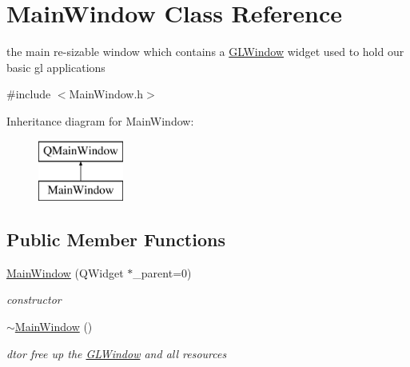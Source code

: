 \hypertarget{class_main_window}{\section{Main\-Window Class Reference}
\label{class_main_window}
}


the main re-\/sizable window which contains a \hyperlink{class_g_l_window}{G\-L\-Window} widget used to hold our basic gl applications  




{\ttfamily \#include $<$Main\-Window.\-h$>$}

Inheritance diagram for Main\-Window\-:\begin{figure}[H]
\begin{center}
\leavevmode
\includegraphics[height=2.000000cm]{class_main_window}
\end{center}
\end{figure}
\subsection*{Public Member Functions}
\begin{DoxyCompactItemize}
\item 
\hyperlink{class_main_window_a93cfdcac35db98baf6a7d2c2738a2006}{Main\-Window} (Q\-Widget $\ast$\-\_\-parent=0)
\begin{DoxyCompactList}\small\item\em constructor \end{DoxyCompactList}\item 
\hypertarget{class_main_window_ae98d00a93bc118200eeef9f9bba1dba7}{\hyperlink{class_main_window_ae98d00a93bc118200eeef9f9bba1dba7}{$\sim$\-Main\-Window} ()}\label{class_main_window_ae98d00a93bc118200eeef9f9bba1dba7}

\begin{DoxyCompactList}\small\item\em dtor free up the \hyperlink{class_g_l_window}{G\-L\-Window} and all resources \end{DoxyCompactList}\end{DoxyCompactItemize}
